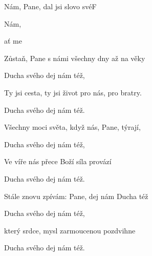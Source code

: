 \setcounter{page}{109}
\begin{song}{Nám, Pane, dal jsi slovo své}{F}{}

\begin{SBChorus}

Nám, 

 

ať   me


\end{SBChorus}

\begin{SBVerse}

Zůstaň, Pane s námi všechny dny až na věky

Ducha svého dej nám též,

Ty jsi cesta, ty jsi život pro nás, pro bratry.

Ducha svého dej nám též.

\end{SBVerse}

\begin{SBVerse}

Všechny moci světa, když nás, Pane, týrají,

Ducha svého dej nám též,

Ve víře nás přece Boží síla provází

Ducha svého dej nám též.

\end{SBVerse}

\begin{SBVerse}

Stále znovu zpívám: Pane, dej nám Ducha též

Ducha svého dej nám též,

který srdce, mysl zarmoucenou pozdvihne

Ducha svého dej nám též.

\end{SBVerse}

\end{song}
